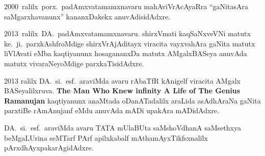 {\rm 2000}~ralilx~porx.~padAmxvatamamxnavaru mahAviVrAcAyaRra ``gaNitasAra saMgarxhavanunx'' kananxDakekx anuvAdisidAdxre.

{\rm 2013}~ralilx~DA.~padAmxvatamamxnavaru. shirxVmati kaqSaNxveVNi matutx ke.~ji.~parxkAshf\-roMdige shirxVrAjAditayx viracita vayxvahAra gaNita matutx liVlAvati eMba kaqtiyanunx hosagananxDa matutx AMgalxBASeya anuvAda matutx vivaraNeyoMdige parxkaTisidAdxre.

{\rm 2013} ralilx DA.~si.~esf.~araviMda avaru rAbaTfR kAnigelf viracita AMgalx BASeyalilxruva.
{\bf\rm The Man Who Knew infinity A Life of The Genius Ramanujan} kaqtiyanunx anaMtada oDanATadalilx araLida asAdhAraNa gaNita parxtiBe rAmAnujanf eMdu anuvAda mADi upakAra mADidAdxre.

DA.~si.~esf.~araviMda avaru TATA mUlaBUta saMshoVdhanA saMsethxya beMgaLUrina seMTarf PArf apilxkabalf mAthamAyxTikfsxnalilx pArxdhAyxpakarAgidAdxre.

